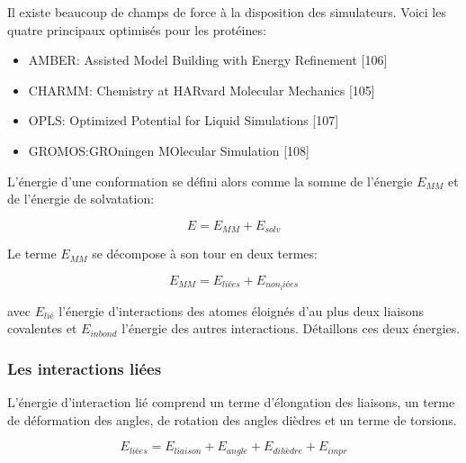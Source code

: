 Il existe beaucoup de champs de force à la disposition des simulateurs. Voici les quatre principaux optimisés pour les protéines:

\begin{itemize}
\item AMBER: Assisted Model Building with Energy Refinement [106]
\item CHARMM: Chemistry at HARvard Molecular Mechanics [105]
\item OPLS: Optimized Potential for Liquid Simulations [107]
\item GROMOS:GROningen MOlecular Simulation [108]
\end{itemize}

L'énergie d'une conformation se défini alors comme la somme de l'énergie $E_{MM}$  et de l'énergie de solvatation:

\begin{equation}
  E = E_{MM} + E_{solv}
\end{equation}

Le terme $E_{MM}$ se décompose à son tour en deux termes:

\begin{equation}
  E_{MM} = E_{liées} + E_{non_liées}
\end{equation}

avec $E_{lié}$ l'énergie d'interactions des atomes éloignés d'au plus deux liaisons covalentes et $E_{inbond}$  l'énergie des autres interactions. Détaillons ces deux énergies.

\subsubsection{Les interactions liées }

L'énergie d'interaction lié comprend un terme d'élongation des liaisons, un terme de déformation des angles, de rotation des angles dièdres et un terme de torsions.


\begin{equation}
  E_{liées} = E_{liaison} + E_{angle} +E_{dihèdre} + E_{impr}
\end{equation}


